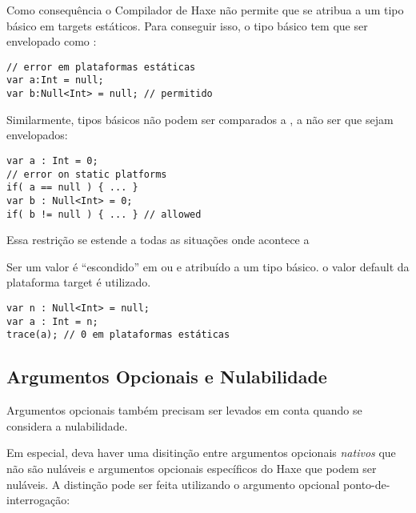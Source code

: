 Como consequência o Compilador de Haxe não permite que se atribua  a um tipo básico em targets estáticos. Para conseguir isso, o tipo básico tem que ser envelopado como :

\begin{lstlisting}
// error em plataformas estáticas
var a:Int = null;
var b:Null<Int> = null; // permitido
\end{lstlisting}

Similarmente, tipos básicos não podem ser comparados a , a não ser que sejam envelopados:

\begin{lstlisting}
var a : Int = 0;
// error on static platforms
if( a == null ) { ... }
var b : Null<Int> = 0;
if( b != null ) { ... } // allowed
\end{lstlisting}

Essa restrição se estende a todas as situações onde acontece a  


Ser um valor   é ``escondido'' em  ou  e atribuído a um tipo básico. o valor default da plataforma target é utilizado.

\begin{lstlisting}
var n : Null<Int> = null;
var a : Int = n;
trace(a); // 0 em plataformas estáticas 
\end{lstlisting}



\subsection{Argumentos Opcionais e Nulabilidade}
\label{types-nullability-optional-arguments}

Argumentos opcionais também precisam ser levados em conta quando se considera a nulabilidade.

Em especial, deva haver uma disitinção entre argumentos opcionais \emph{nativos} que não são nuláveis e argumentos opcionais específicos do Haxe que podem ser nuláveis. A distinção pode ser feita utilizando o argumento opcional ponto-de-interrogação:

